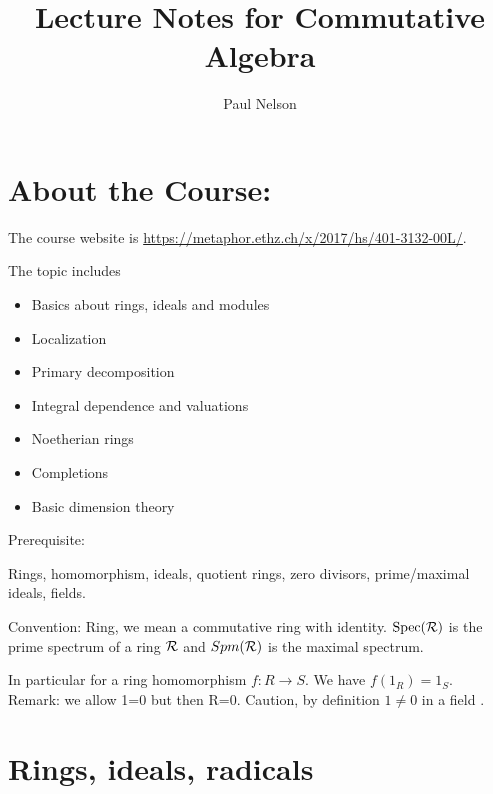 \documentclass[11pt]{article}
\title{\bf Lecture Notes for Commutative Algebra}
\author{Paul Nelson} %
\newcommand{\calr}{{\cal R}}
\begin{document}
\maketitle
\tableofcontents
\newpage

\section*{About the Course:}
The course website is \href{https://metaphor.ethz.ch/x/2017/hs/401-3132-00L/}{https://metaphor.ethz.ch/x/2017/hs/401-3132-00L/}. 

The topic includes
\begin{itemize}
\item 
Basics about rings, ideals and modules
\item 
Localization
\item 
Primary decomposition
\item 
Integral dependence and valuations
\item 
Noetherian rings
\item 
Completions
\item 
Basic dimension theory
\end{itemize}
Prerequisite:

Rings, homomorphism, ideals, quotient rings, zero divisors, prime/maximal ideals, fields.

Convention: 
Ring, we mean a commutative ring with identity. $\text{Spec}(\calr)$ is the prime spectrum of a ring $\calr$ and $Spm(\calr)$ is the maximal spectrum.

In particular for a ring homomorphism $f:R\rightarrow S$. We have $f(1_R)=1_S$.
 
Remark:
we allow 1=0 but then R=0.
Caution, by definition $1\neq 0$ in a field .
\section{Rings, ideals, radicals}
\end{document}
